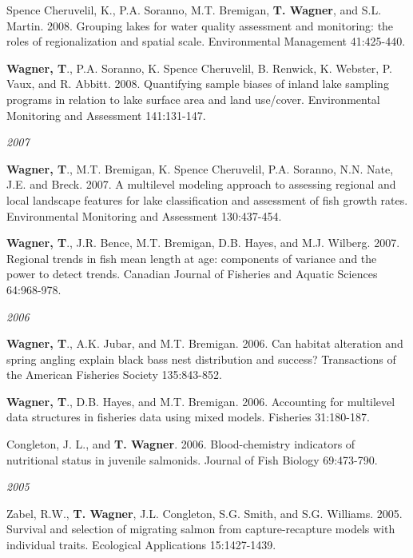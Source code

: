 \documentclass[10pt]{article}
\begin{document}
\begin{flushleft}
\begin{etaremune}[start=14]
\item Spence Cheruvelil, K., P.A. Soranno, M.T. Bremigan, {\bf T. Wagner}, and S.L. Martin. 2008. Grouping lakes for water quality assessment and monitoring: the roles of regionalization and spatial scale. Environmental Management 41:425-440. 

\item {\bf Wagner, T}., P.A. Soranno, K. Spence Cheruvelil, B. Renwick, K. Webster, P. Vaux, and R. Abbitt. 2008. Quantifying sample biases of inland lake sampling programs in relation to lake surface area and land use/cover. Environmental Monitoring and Assessment 141:131-147.

\end{etaremune}
\emph{2007}
\begin{etaremune}[start=9]
\item {\bf Wagner, T}., M.T. Bremigan, K. Spence Cheruvelil, P.A. Soranno, N.N. Nate, J.E. and Breck. 2007. A multilevel modeling approach to assessing regional and local landscape features for lake classification and assessment of fish growth rates. Environmental Monitoring and Assessment 130:437-454.

\item {\bf Wagner, T}., J.R. Bence, M.T. Bremigan, D.B. Hayes, and M.J. Wilberg. 2007. Regional trends in fish mean length at age: components of variance and the power to detect trends. Canadian Journal of Fisheries and Aquatic Sciences 64:968-978.

\end{etaremune}
\emph{2006}
\begin{etaremune}[start=7]
\item {\bf Wagner, T}., A.K. Jubar, and M.T. Bremigan. 2006. Can habitat alteration and spring angling explain black bass nest distribution and success? Transactions of the American Fisheries Society 135:843-852.

\item {\bf Wagner, T}., D.B. Hayes, and M.T. Bremigan. 2006. Accounting for multilevel data structures in fisheries data using mixed models. Fisheries 31:180-187.

\item Congleton, J. L., and {\bf T. Wagner}. 2006. Blood-chemistry indicators of nutritional status in juvenile salmonids. Journal of Fish Biology 69:473-790.

\end{etaremune}
\emph{2005}
\begin{etaremune}[start=4]
\item Zabel, R.W., {\bf T. Wagner}, J.L. Congleton, S.G. Smith, and S.G. Williams. 2005. Survival and selection of migrating salmon from capture-recapture models with individual traits. Ecological Applications 15:1427-1439. 


\end{etaremune}
\end{flushleft}
\end{document}
